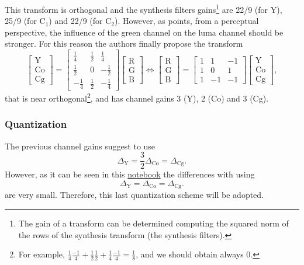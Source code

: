 This transform is orthogonal and the synthesis filters
gains\footnote{The gain of a transform can be determined computing the
squared norm of the rows of the synthesis transform (the synthesis
filters).} are 22/9 (for Y), 25/9 (for C$_1$) and 22/9 (for C$_2$). However,
as \cite{malvar2008lifting} points, from a perceptual perspective, the
influence of the green channel on the luma channel should be
stronger. For this reason the authors finally propose the transform
\begin{equation}
  \begin{bmatrix}
    \text{Y} \\
    \text{Co} \\
    \text{Cg}
  \end{bmatrix}
  =
  \begin{bmatrix}
    \frac{1}{4} &  \frac{1}{2}  &  \frac{1}{4} \\ 
    \frac{1}{2} &            0  & -\frac{1}{2} \\
    -\frac{1}{4} &  \frac{1}{2}  & -\frac{1}{4}
  \end{bmatrix}
  \begin{bmatrix}
    \text{R} \\
    \text{G} \\
    \text{B}
  \end{bmatrix}
  \Leftrightarrow
  \begin{bmatrix}
    \text{R} \\
    \text{G} \\
    \text{B}
  \end{bmatrix}
  =
  \begin{bmatrix}
    1  &  1  & -1 \\ 
    1  &  0  &  1 \\ 
    1  & -1  & -1
  \end{bmatrix}
  \begin{bmatrix}
    \text{Y} \\
    \text{Co} \\
    \text{Cg}
  \end{bmatrix},
\end{equation}
that is near orthogonal\footnote{For example, $\frac{1}{4}\frac{-1}{4}
+ \frac{1}{2}\frac{1}{2} + \frac{1}{4}\frac{-1}{4} = \frac{1}{8}$, and
we should obtain always 0.}, and has channel gains 3 (Y), 2 (Co) and 3
(Cg). %

\subsubsection{Quantization}
The previous channel gains suggest to use
\begin{equation}
  \Delta_{\text{Y}} = \frac{3}{2}\Delta_{\text{Co}} = \Delta_{\text{Cg}}.
\end{equation}
However, as it can be seen in this \href{https://github.com/Sistemas-Multimedia/Sistemas-Multimedia.github.io/blob/master/study_guide/06-color_transform/performance.ipynb}{notebook} the differences with using
\begin{equation}
  \Delta_{\text{Y}} = \Delta_{\text{Co}} = \Delta_{\text{Cg}}.
\end{equation}
are very small. Therefore, this last quantization scheme will be adopted.

